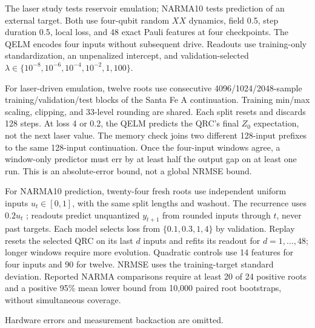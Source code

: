 The laser study tests reservoir emulation; NARMA10 tests prediction of
an external target. Both use four-qubit random $XX$ dynamics, field 0.5,
step duration 0.5, local loss, and 48 exact Pauli features at four
checkpoints. The QELM encodes four inputs without subsequent drive.
Readouts use training-only standardization, an unpenalized intercept,
and validation-selected
$\lambda\in\{10^{-8},10^{-6},10^{-4},10^{-2},1,100\}$.

For laser-driven emulation, twelve roots use consecutive
4096/1024/2048-sample training/validation/test blocks of the Santa Fe A
continuation. Training min/max scaling, clipping, and 33-level rounding
are shared. Each split resets and discards 128 steps. At loss 4 or 0.2,
the QELM predicts the QRC's final $Z_0$ expectation, not the next laser
value. The memory check joins two different 128-input prefixes to the
same 128-input continuation. Once the four-input windows agree, a
window-only predictor must err by at least half the output gap on at
least one run. This is an absolute-error bound, not a global NRMSE bound.

\label{app:task-forecasting}
For NARMA10 prediction, twenty-four fresh roots use independent uniform
inputs $u_t\in[0,1]$,
with the same split lengths and washout. The recurrence uses $0.2u_t$
\cite{fujii2017harnessing}; readouts predict unquantized $y_{t+1}$ from
rounded inputs through $t$, never past targets. Each model selects loss
from $\{0.1,0.3,1,4\}$ by validation. Replay resets the selected QRC on
its last $d$ inputs and refits its readout for $d=1,\ldots,48$; longer
windows require more evolution. Quadratic controls use 14 features for
four inputs and 90 for twelve. NRMSE uses the training-target standard
deviation. Reported NARMA comparisons require at least 20 of 24 positive
roots and a positive 95\% mean lower bound from 10,000 paired root
bootstraps, without simultaneous coverage.

Hardware errors and measurement backaction are omitted.
